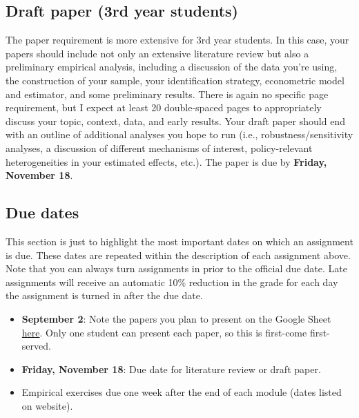 \documentclass[11pt,]{article}
\providecommand{\tightlist}{%
  \setlength{\itemsep}{0pt}\setlength{\parskip}{0pt}}
\begin{document}
\hypertarget{draft-paper-3rd-year-students}{%
\subsection{Draft paper (3rd year
students)}\label{draft-paper-3rd-year-students}}

The paper requirement is more extensive for 3rd year students. In this
case, your papers should include not only an extensive literature review
but also a preliminary empirical analysis, including a discussion of the
data you're using, the construction of your sample, your identification
strategy, econometric model and estimator, and some preliminary results.
There is again no specific page requirement, but I expect at least 20
double-spaced pages to appropriately discuss your topic, context, data,
and early results. Your draft paper should end with an outline of
additional analyses you hope to run (i.e., robustness/sensitivity
analyses, a discussion of different mechanisms of interest,
policy-relevant heterogeneities in your estimated effects, etc.). The
paper is due by \textbf{Friday, November 18}.

\hypertarget{due-dates}{%
\subsection{Due dates}\label{due-dates}}

This section is just to highlight the most important dates on which an
assignment is due. These dates are repeated within the description of
each assignment above. Note that you can always turn assignments in
prior to the official due date. Late assignments will receive an
automatic 10\% reduction in the grade for each day the assignment is
turned in after the due date.

\begin{itemize}
\tightlist
\item
  \textbf{September 2}: Note the papers you plan to present on the
  Google Sheet
  \href{https://docs.google.com/spreadsheets/d/1d6IVg-khbreLKobiczNwEOT9gjPNNykrFEtc2rXdJ4I/edit?usp=sharing}{here}.
  Only one student can present each paper, so this is first-come
  first-served.
\item
  \textbf{Friday, November 18}: Due date for literature review or draft
  paper.
\item
  Empirical exercises due one week after the end of each module (dates
  listed on website).
\end{itemize}
\end{document}
